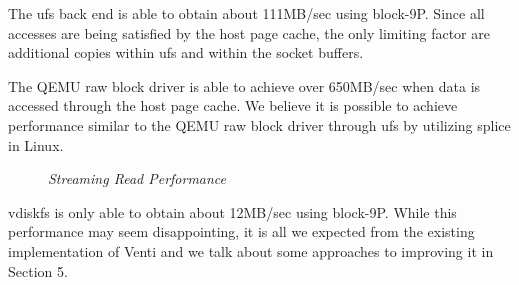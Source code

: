 The ufs back end is able to obtain about 111MB/sec using
block-9P.  Since all accesses are being satisfied by the
host page cache, the only limiting factor are additional
copies within ufs and within the socket buffers.

The QEMU raw block driver is able to achieve over
650MB/sec when data is accessed through the host page cache.
We believe it is possible to achieve performance similar to
the QEMU raw block driver through ufs by utilizing splice
in Linux.

\begin{figure}[htbp]
\begin{centering}
\small\itshape
\caption{\small\itshape Streaming Read Performance}
\label{fig:streamingread}
\end{centering}
\end{figure}

vdiskfs is only able to obtain about 12MB/sec using
block-9P. 
While this performance may seem disappointing, it
is all we expected from the existing implementation
of Venti and we talk about some approaches to improving
it in Section 5.
